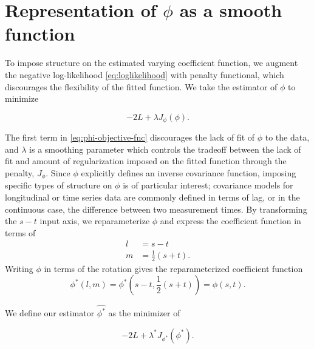 \documentclass[12pt]{article}
\theoremstyle{definition}
\begin{document}
\section{Representation of $\phi$ as a smooth function}

To impose structure on the estimated varying coefficient function, we augment the negative log-likelihood \ref{eq:loglikelihood} with penalty functional, which discourages the flexibility of the fitted function. We take the estimator of $\phi$ to minimize

\begin{equation} 
 -2 L + \lambda J_{\phi}\left(\phi\right)  \label{eq:phi-objective-fnc}.
\end{equation}

The first term in \ref{eq:phi-objective-fnc} discourages the lack of fit of $\phi$ to the data, and $\lambda$ is a smoothing parameter which controls the tradeoff between the lack of fit and amount of regularization imposed on the fitted function through the penalty, $J_\phi$. Since $\phi$ explicitly defines an inverse covariance function, imposing specific types of structure on $\phi$ is of particular interest; covariance models for longitudinal or time series data are commonly defined in terms of lag, or in the continuous case, the difference between two measurement times.  By transforming the $s-t$ input axis, we reparameterize $\phi$ and express the coefficient function in terms of   
\begin{align*}
l &= s-t \\
m &= \frac{1}{2}\left(s+t\right).
\end{align*}
\noindent
Writing $\phi$ in terms of the rotation gives the reparameterized coefficient function 
\begin{equation}
\phi^*\left(l,m\right) = \phi^*\left(s-t, \frac{1}{2}\left(s+t\right)\right) = \phi\left(s,t\right).
\end{equation}

We define our estimator $\hat{\phi^*}$ as the minimizer of

\begin{equation} 
-2 L + \lambda^* J_{\phi^*}\left(\phi^*\right) \label{eq:phi-star-objective-fnc}.
\end{equation}
\end{document}
